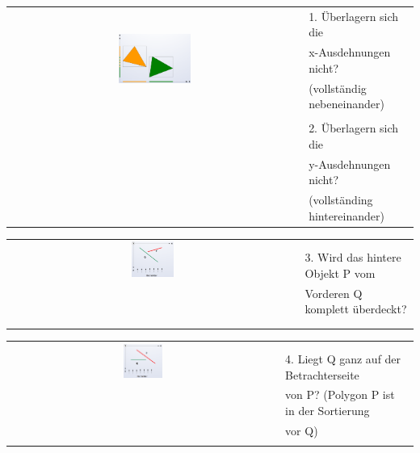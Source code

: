 \begin{tabular}{cl}
  \multirow{3}{*}{
    \includegraphics[width=0.25\textwidth]{assets/paintersalg-overlapping.png}
  } & 1. Überlagern sich die \\
  & x-Ausdehnungen nicht? \\
  & (vollständig nebeneinander) \\
  & \\
  & 2. Überlagern sich die \\
  & y-Ausdehnungen nicht? \\
  & (vollständing hintereinander)\\
\end{tabular}

\begin{tabular}{cl}
  \multirow{3}{*}{
    \includegraphics[width=0.15\textwidth]{assets/paintersalg-backside.png}
  } & \\
  & \\
  & 3. Wird das hintere Objekt P vom \\
  & Vorderen Q komplett überdeckt? \\
  & \\
  & \\
\end{tabular}

\begin{tabular}{cl}
  \multirow{3}{*}{
    \includegraphics[width=0.15\textwidth]{assets/paintersalg-frontside.png}
  } & \\
  & \\
  & 4. Liegt Q ganz auf der Betrachterseite  \\
  & von P? (Polygon P ist in der Sortierung \\
  & vor Q) \\
  & \\
\end{tabular}

